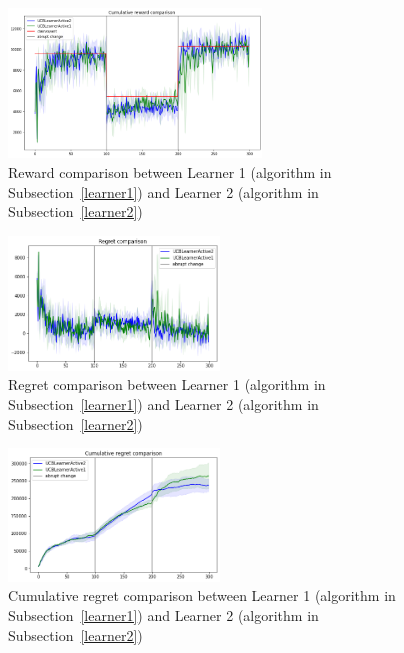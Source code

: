 \begin{figure}[ht]
    \begin{center}
    \includegraphics[width=0.6\textwidth]{img/reward_LA1vsLA2.png}
    \caption{Reward comparison between Learner 1 (algorithm in Subsection~\ref{learner1}) and Learner 2 (algorithm in Subsection~\ref{learner2})}
    \label{fig:reward62}
    \end{center}
\end{figure}
\begin{multicols}{2}
    \begin{figure}[H]
        \begin{center}
        \includegraphics[width=0.5\textwidth]{img/regret_LA1vsLA2.png}
        \caption{Regret comparison between Learner 1 (algorithm in Subsection~\ref{learner1}) and Learner 2 (algorithm in Subsection~\ref{learner2})}
        \label{fig:regret62}
        \end{center}
    \end{figure}
    \columnbreak
    \begin{figure}[H]
        \begin{center}
        \includegraphics[width=0.5\textwidth]{img/cumulative_regret_LA1vsLA2.png}
        \caption{Cumulative regret comparison between Learner 1 (algorithm in Subsection~\ref{learner1}) and Learner 2 (algorithm in Subsection~\ref{learner2})}
        \label{fig:cum_reg62}
        \end{center}
    \end{figure}
\end{multicols}


